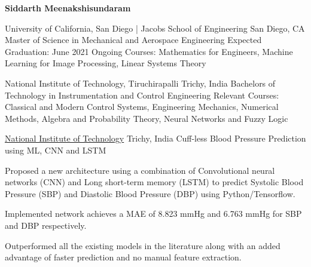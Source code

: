 \documentclass[10pt]{article}
\begin{document}
	
\begin{center}
	\textbf{\LARGE Siddarth Meenakshisundaram}\\[0.5ex]
\end{center}
\spacedhrule{-1.0ex}{-0.5ex}


\headedsection
{University of California, San Diego | Jacobs School of Engineering}
{San Diego, CA}
{Master of Science in Mechanical and Aerospace Engineering}
{{Expected Graduation: }{June 2021}{}{}}
{Ongoing Courses: Mathematics for Engineers, Machine Learning for Image Processing, Linear Systems Theory}

\headedsection
{National Institute of Technology, Tiruchirapalli   }
{Trichy, India}
{Bachelors of Technology in Instrumentation and Control Engineering}
{}
{Relevant Courses: Classical and Modern Control Systems, Engineering Mechanics, Numerical Methods, Algebra and Probability Theory, Neural Networks and Fuzzy Logic}%


\spacedhrule{0.8ex}{0.0ex}


\headedsection
{\href{https://www.nitt.edu/}{National Institute of Technology}}
{Trichy, India}
{Cuff-less Blood Pressure Prediction using ML, CNN and LSTM}
{}{
\vspace{-2.4ex}
\begin{circlist}	
	\item Proposed a new architecture using a combination of Convolutional neural networks (CNN) and Long short-term memory (LSTM) to predict Systolic Blood Pressure (SBP) and Diastolic Blood Pressure (DBP) using Python/Tensorflow.
	\item Implemented network achieves a MAE of 8.823 mmHg and 6.763 mmHg for SBP and DBP respectively.
	\item Outperformed all the existing models in the literature along with an added advantage of faster prediction and no manual feature extraction.
\end{circlist}
}
\end{document}
